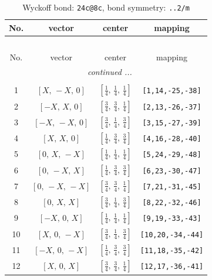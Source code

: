\documentclass[fleqn,8pt]{jsarticle}
\begin{document}
\renewcommand{\arraystretch}{1.2}
\begin{longtable}{cccc}
\caption{Wyckoff bond: {\tt 24c@8c}, bond symmetry: {\tt ..2/m}}
 \\
 \hline \hline
No. & vector & center & mapping \\ \hline \endfirsthead

\multicolumn{3}{l}{\tablename\ \thetable{}} \\
 \hline \hline
No. & vector & center & mapping \\ \hline \endhead

 \hline \hline
\multicolumn{3}{r}{\footnotesize\it continued ...} \\ \endfoot

 \hline \hline
\multicolumn{3}{r}{} \\ \endlastfoot

1 & $\left[ X,\, - X,\, 0 \right]$ & $\left[ \frac{1}{4},\, \frac{1}{4},\, \frac{1}{4} \right]$ & {\tt [1,14,-25,-38]} \\ \hline
2 & $\left[ - X,\, X,\, 0 \right]$ & $\left[ \frac{3}{4},\, \frac{3}{4},\, \frac{1}{4} \right]$ & {\tt [2,13,-26,-37]} \\ \hline
3 & $\left[ - X,\, - X,\, 0 \right]$ & $\left[ \frac{3}{4},\, \frac{1}{4},\, \frac{3}{4} \right]$ & {\tt [3,15,-27,-39]} \\ \hline
4 & $\left[ X,\, X,\, 0 \right]$ & $\left[ \frac{1}{4},\, \frac{3}{4},\, \frac{3}{4} \right]$ & {\tt [4,16,-28,-40]} \\ \hline
5 & $\left[ 0,\, X,\, - X \right]$ & $\left[ \frac{1}{4},\, \frac{1}{4},\, \frac{1}{4} \right]$ & {\tt [5,24,-29,-48]} \\ \hline
6 & $\left[ 0,\, - X,\, X \right]$ & $\left[ \frac{1}{4},\, \frac{3}{4},\, \frac{3}{4} \right]$ & {\tt [6,23,-30,-47]} \\ \hline
7 & $\left[ 0,\, - X,\, - X \right]$ & $\left[ \frac{3}{4},\, \frac{3}{4},\, \frac{1}{4} \right]$ & {\tt [7,21,-31,-45]} \\ \hline
8 & $\left[ 0,\, X,\, X \right]$ & $\left[ \frac{3}{4},\, \frac{1}{4},\, \frac{3}{4} \right]$ & {\tt [8,22,-32,-46]} \\ \hline
9 & $\left[ - X,\, 0,\, X \right]$ & $\left[ \frac{1}{4},\, \frac{1}{4},\, \frac{1}{4} \right]$ & {\tt [9,19,-33,-43]} \\ \hline
10 & $\left[ X,\, 0,\, - X \right]$ & $\left[ \frac{3}{4},\, \frac{1}{4},\, \frac{3}{4} \right]$ & {\tt [10,20,-34,-44]} \\ \hline
11 & $\left[ - X,\, 0,\, - X \right]$ & $\left[ \frac{1}{4},\, \frac{3}{4},\, \frac{3}{4} \right]$ & {\tt [11,18,-35,-42]} \\ \hline
12 & $\left[ X,\, 0,\, X \right]$ & $\left[ \frac{3}{4},\, \frac{3}{4},\, \frac{1}{4} \right]$ & {\tt [12,17,-36,-41]} \\
\end{longtable}
\end{document}
